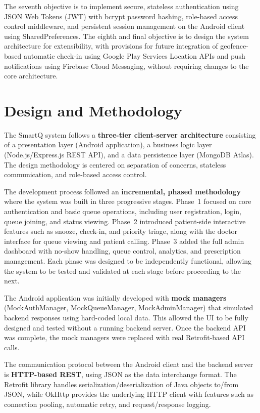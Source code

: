 \documentclass[12pt,a4paper]{article}
\begin{document}
The seventh objective is to implement secure, stateless authentication using JSON Web Tokens (JWT) with bcrypt password hashing, role-based access control middleware, and persistent session management on the Android client using SharedPreferences. The eighth and final objective is to design the system architecture for extensibility, with provisions for future integration of geofence-based automatic check-in using Google Play Services Location APIs and push notifications using Firebase Cloud Messaging, without requiring changes to the core architecture.

\section{Design and Methodology}

The SmartQ system follows a \textbf{three-tier client-server architecture} consisting of a presentation layer (Android application), a business logic layer (Node.js/Express.js REST API), and a data persistence layer (MongoDB Atlas). The design methodology is centered on separation of concerns, stateless communication, and role-based access control.

The development process followed an \textbf{incremental, phased methodology} where the system was built in three progressive stages. Phase~1 focused on core authentication and basic queue operations, including user registration, login, queue joining, and status viewing. Phase~2 introduced patient-side interactive features such as snooze, check-in, and priority triage, along with the doctor interface for queue viewing and patient calling. Phase~3 added the full admin dashboard with no-show handling, queue control, analytics, and prescription management. Each phase was designed to be independently functional, allowing the system to be tested and validated at each stage before proceeding to the next.

The Android application was initially developed with \textbf{mock managers} (MockAuthManager, MockQueueManager, MockAdminManager) that simulated backend responses using hard-coded local data. This allowed the UI to be fully designed and tested without a running backend server. Once the backend API was complete, the mock managers were replaced with real Retrofit-based API calls.

The communication protocol between the Android client and the backend server is \textbf{HTTP-based REST}, using JSON as the data interchange format. The Retrofit library handles serialization/deserialization of Java objects to/from JSON, while OkHttp provides the underlying HTTP client with features such as connection pooling, automatic retry, and request/response logging.
\end{document}
